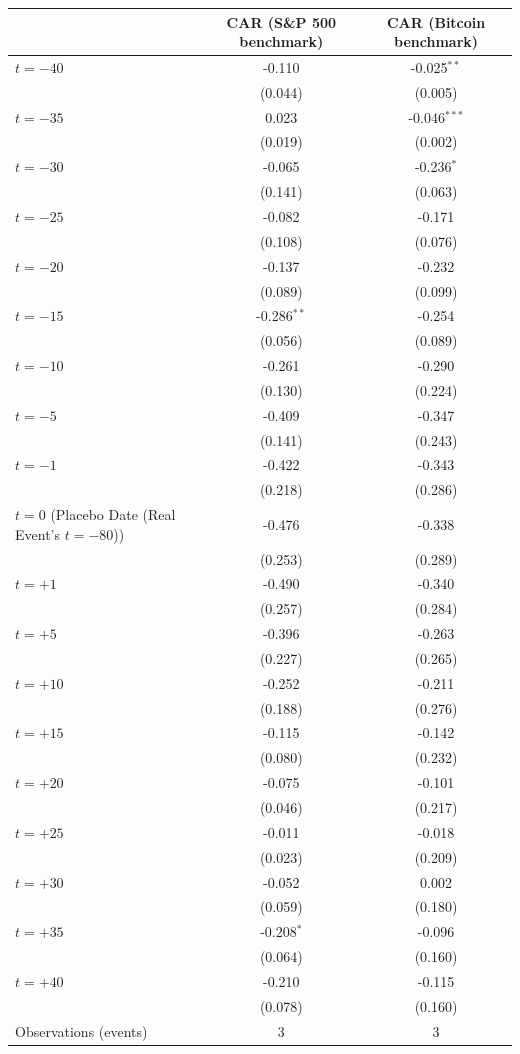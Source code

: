 \begin{tabular}{lcc}
\toprule
 & CAR (S\&P 500 benchmark) & CAR (Bitcoin benchmark) \\
\midrule
\quad $t=-40$ & -0.110 & -0.025$^{**}$ \\
 & (0.044) & (0.005) \\
\quad $t=-35$ & 0.023 & -0.046$^{***}$ \\
 & (0.019) & (0.002) \\
\quad $t=-30$ & -0.065 & -0.236$^{*}$ \\
 & (0.141) & (0.063) \\
\quad $t=-25$ & -0.082 & -0.171 \\
 & (0.108) & (0.076) \\
\quad $t=-20$ & -0.137 & -0.232 \\
 & (0.089) & (0.099) \\
\quad $t=-15$ & -0.286$^{**}$ & -0.254 \\
 & (0.056) & (0.089) \\
\quad $t=-10$ & -0.261 & -0.290 \\
 & (0.130) & (0.224) \\
\quad $t=-5$ & -0.409 & -0.347 \\
 & (0.141) & (0.243) \\
\quad $t=-1$ & -0.422 & -0.343 \\
 & (0.218) & (0.286) \\
\quad $t=0$ (Placebo Date (Real Event's $t=-80$)) & -0.476 & -0.338 \\
 & (0.253) & (0.289) \\
\quad $t=+1$ & -0.490 & -0.340 \\
 & (0.257) & (0.284) \\
\quad $t=+5$ & -0.396 & -0.263 \\
 & (0.227) & (0.265) \\
\quad $t=+10$ & -0.252 & -0.211 \\
 & (0.188) & (0.276) \\
\quad $t=+15$ & -0.115 & -0.142 \\
 & (0.080) & (0.232) \\
\quad $t=+20$ & -0.075 & -0.101 \\
 & (0.046) & (0.217) \\
\quad $t=+25$ & -0.011 & -0.018 \\
 & (0.023) & (0.209) \\
\quad $t=+30$ & -0.052 & 0.002 \\
 & (0.059) & (0.180) \\
\quad $t=+35$ & -0.208$^{*}$ & -0.096 \\
 & (0.064) & (0.160) \\
\quad $t=+40$ & -0.210 & -0.115 \\
 & (0.078) & (0.160) \\
\midrule
Observations (events) & 3 & 3 \\
\bottomrule
\end{tabular}
